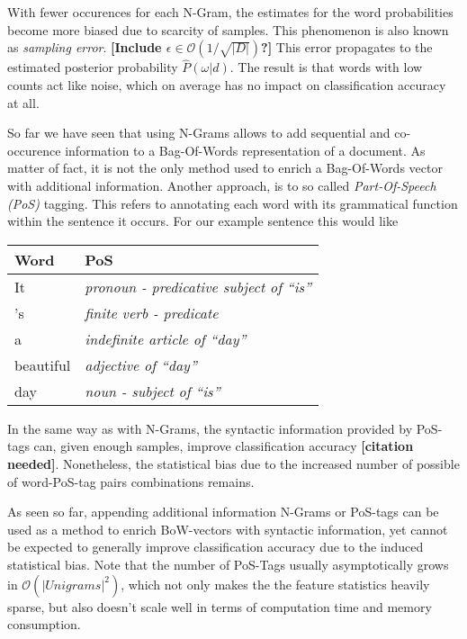 With fewer occurences for each N-Gram, the estimates for the word probabilities
become more biased due to scarcity of samples. This phenomenon is also
known as \emph{sampling error}. \textbf{[Include $\epsilon \in
\mathcal{O}(1/\sqrt{|D|})$?]} This error propagates to the estimated posterior
probability $\hat{P}(\omega|d)$. The result is that words with low counts act
like noise, which on average has no impact on classification accuracy at all.
 
So far we have seen that using N-Grams allows to add sequential and
co-occurence information to a Bag-Of-Words representation of a document. As
matter of fact, it is not the only method used to enrich a Bag-Of-Words vector
with additional information. Another approach, is to so called
\emph{Part-Of-Speech (PoS)} tagging. This refers to annotating each word with its grammatical
 function within the sentence it occurs. For our example sentence this would like

\begin{center}
\begin{tabular}{|l|l|}
\hline
\textbf{Word} & \textbf{PoS} \\
\hline 
It 		  & \emph{pronoun - predicative subject of ``is''} \\
's 		  & \emph{finite verb - predicate} \\ 
a 		  & \emph{indefinite article of ``day''}  \\
beautiful & \emph{adjective of ``day''} \\
day		  & \emph{noun - subject of ``is''} \\
\hline
\end{tabular}
\end{center}

In the same way as with N-Grams, the syntactic information provided by PoS-tags
can, given enough samples, improve classification accuracy \textbf{[citation
needed]}.
Nonetheless, the statistical bias due to the increased number of possible of
word-PoS-tag pairs combinations remains.

As seen so far, appending additional information N-Grams or PoS-tags can be used as a method
to enrich BoW-vectors with syntactic information, yet cannot be
expected to generally improve classification accuracy due to the induced
statistical bias. Note that the number of PoS-Tags usually asymptotically grows
in $\mathcal{O}(|Unigrams|^2)$, which not only makes the the feature statistics
heavily sparse, but also doesn't scale well in terms of computation time and
memory consumption.

